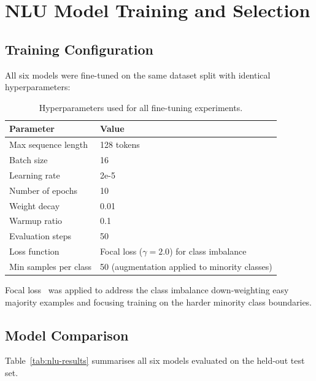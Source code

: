 \section{NLU Model Training and Selection}
\label{sec:results-nlu}

\subsection{Training Configuration}

All six models were fine-tuned on the same dataset split with identical
hyperparameters:

\begin{table}[H]
\centering
\caption{Hyperparameters used for all fine-tuning experiments.}
\label{tab:hyperparams}
\small
\begin{tabularx}{\textwidth}{Y Y}
\toprule
\textbf{Parameter} & \textbf{Value} \\
\midrule
Max sequence length    & 128 tokens \\
Batch size             & 16 \\
Learning rate          & 2e-5 \\
Number of epochs       & 10 \\
Weight decay           & 0.01 \\
Warmup ratio           & 0.1 \\
Evaluation steps       & 50 \\
Loss function          & Focal loss ($\gamma = 2.0$) for class imbalance \\
Min samples per class  & 50 (augmentation applied to minority classes) \\
\bottomrule
\end{tabularx}
\end{table}

\noindent Focal loss~\cite{an2022} was applied to address the class imbalance down-weighting easy majority
examples and focusing training on the harder minority class boundaries.

\subsection{Model Comparison}

Table~\ref{tab:nlu-results} summarises all six models evaluated on the held-out
test set.

